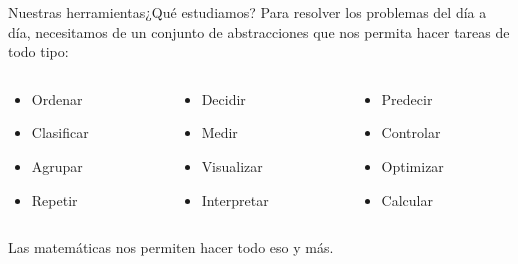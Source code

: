 \documentclass[spanish, handout]{beamer}
\begin{document}
\begin{frame}{Nuestras herramientas}{¿Qué estudiamos?}
    Para resolver los problemas del día a día, necesitamos de un conjunto de abstracciones que nos permita hacer tareas de todo tipo: \pause

    \bigskip

    \begin{columns}
        \begin{column}{0.33\textwidth}
            \begin{center}
                \begin{itemize}
                    \item Ordenar
                    \item Clasificar
                    \item Agrupar
                    \item Repetir
                \end{itemize}
            \end{center}
        \end{column}
        \begin{column}{0.33\textwidth}
            \begin{center}
                \begin{itemize}
                    \item Decidir
                    \item Medir
                    \item Visualizar
                    \item Interpretar
                \end{itemize}
            \end{center}
        \end{column}
        \begin{column}{0.33\textwidth}
            \begin{center}
                \begin{itemize}
                    \item Predecir
                    \item Controlar
                    \item Optimizar
                    \item Calcular
                \end{itemize}                
            \end{center}
        \end{column}
    \end{columns} \pause
    
    \bigskip

    \begin{center}
        \Large
        Las \alert{matemáticas} nos permiten hacer todo eso y más.
    \end{center}

\end{frame}
\end{document}
